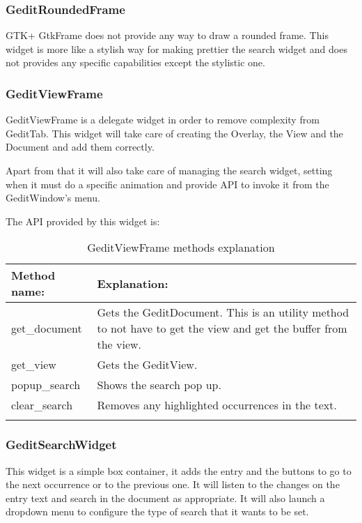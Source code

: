 \subsubsection{GeditRoundedFrame}

GTK+ GtkFrame does not provide any way to draw a rounded frame. This widget is more like a stylish way for making prettier the search widget and does not provides any specific capabilities except the stylistic one.

\subsubsection{GeditViewFrame}

GeditViewFrame is a delegate widget in order to remove complexity from GeditTab. This widget will take care of creating the Overlay, the View and the Document and add them correctly.

Apart from that it will also take care of managing the search widget, setting when it must do a specific animation and provide API to invoke it from the GeditWindow's menu.

The API provided by this widget is:

\begin{table}[H]
  \begin{center}
    \begin{tabularx}{\textwidth}{|X|X|}
      \firsthline
      \textbf{Method name:} & \textbf{Explanation:} \\
      \hline
      get\_document & Gets the GeditDocument. This is an utility method to not have to get the view and get the buffer from the view. \\
      \hline
      get\_view & Gets the GeditView. \\
      \hline
      popup\_search & Shows the search pop up. \\
      \hline
      clear\_search & Removes any highlighted occurrences in the text. \\
      \lasthline
    \end{tabularx}
    \caption{GeditViewFrame methods explanation}
  \end{center}
\end{table}

\subsubsection{GeditSearchWidget}

This widget is a simple box container, it adds the entry and the buttons to go to the next occurrence or to the previous one. It will listen to the changes on the entry text and search in the document as appropriate. It will also launch a dropdown menu to configure the type of search that it wants to be set.

